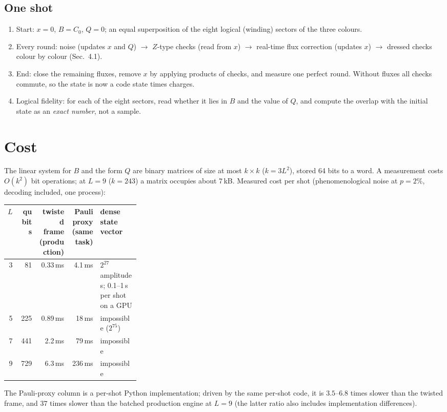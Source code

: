 \documentclass[11pt,a4paper]{article}
\begin{document}
\subsection{One shot}
\begin{enumerate}
\item Start: $x=0$, $B=C_0$, $Q=0$; an equal superposition of the eight logical (winding) sectors of the three colours.
\item Every round: noise (updates $x$ and $Q$) $\to$ $Z$-type checks (read from $x$) $\to$ real-time flux correction (updates $x$) $\to$ dressed checks colour by colour (Sec.~4.1).
\item End: close the remaining fluxes, remove $x$ by applying products of checks, and measure one perfect round. Without fluxes all checks commute, so the state is now a code state times charges.
\item Logical fidelity: for each of the eight sectors, read whether it lies in $B$ and the value of $Q$, and compute the overlap with the initial state as an \emph{exact number}, not a sample.
\end{enumerate}

\section{Cost}

The linear system for $B$ and the form $Q$ are binary matrices of size at most $k\times k$ ($k=3L^2$), stored 64 bits to a word. A measurement costs $O(k^2)$ bit operations; at $L=9$ ($k=243$) a matrix occupies about 7\,kB. Measured cost per shot (phenomenological noise at $p=2\%$, decoding included, one process):
\begin{center}
\begin{tabular}{rrrrp{0.3\linewidth}}
\toprule
$L$ & qubits & \shortstack{twisted frame\\(production)} & \shortstack{Pauli proxy\\(same task)} & dense state vector \\
\midrule
3 & 81 & 0.33\,ms & 4.1\,ms & $2^{27}$ amplitudes; 0.1--1\,s per shot on a GPU \\
5 & 225 & 0.89\,ms & 18\,ms & impossible ($2^{75}$) \\
7 & 441 & 2.2\,ms & 79\,ms & impossible \\
9 & 729 & 6.3\,ms & 236\,ms & impossible \\
\bottomrule
\end{tabular}
\end{center}
The Pauli-proxy column is a per-shot Python implementation; driven by the same per-shot code, it is $3.5$--$6.8$ times slower than the twisted frame, and $37$ times slower than the batched production engine at $L=9$ (the latter ratio also includes implementation differences).
\end{document}

